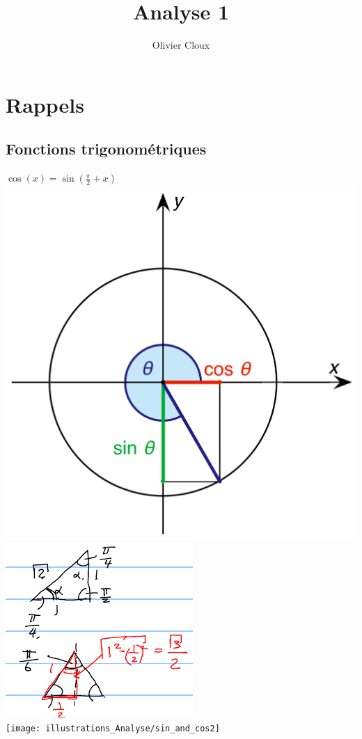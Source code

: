 \documentclass[12pt,a4paper]{article}
\author{Olivier Cloux}
\title{Analyse 1}
\begin{document}
\maketitle
\tableofcontents

\section{Rappels}
\subsection{Fonctions trigonométriques}
\begin{center}
$\cos(x) = \sin(\frac{\pi}{2} + x)$\\
\includegraphics[scale=0.2]{illustrations_Analyse/sin_and_cos}
\includegraphics[scale=0.7]{illustrations_Analyse/trigo}\\
	\texttt{[image: illustrations\_Analyse/sin\_and\_cos2]}
\end{center}
\end{document}

